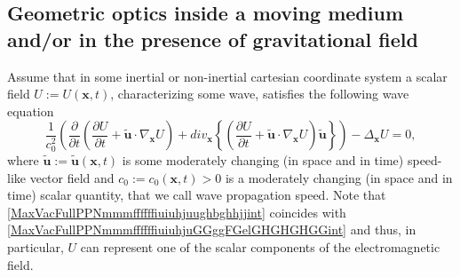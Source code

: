 \documentclass{article}
\theoremstyle{definition}
\theoremstyle{remark}
\renewcommand{\vec}[1]{\mathbf{#1}}
\newcommand{\er}{\eqref}
\newcommand{\er}{\eqref}
\begin{document}
\subsection{Geometric optics inside a moving medium and/or in the presence of gravitational
field}
Assume that in some inertial or non-inertial cartesian coordinate
system a scalar field $U:=U(\vec x,t)$, characterizing some wave,
satisfies the following wave equation
\begin{equation}\label{MaxVacFullPPNmmmffffffiuiuhjuughbghhjjint}
\frac{1}{c^2_0}\left(\frac{\partial}{\partial t}\left(\frac{\partial
U}{\partial t}+\vec {\tilde u}\cdot\nabla_{\vec x}U\right)+div_{\vec
x} \left\{\left(\frac{\partial U}{\partial t}+\vec {\tilde
u}\cdot\nabla_{\vec x} U\right)\vec {\tilde
u}\right\}\right)-\Delta_{\vec x}U=0,
\end{equation}
where $\vec {\tilde u}:=\vec {\tilde u}(\vec x,t)$ is some
moderately changing (in space and in time) speed-like vector field
and $c_0:=c_0(\vec x,t)>0$ is a moderately changing (in space and in
time) scalar quantity, that we call wave propagation speed. Note
that \er{MaxVacFullPPNmmmffffffiuiuhjuughbghhjjint} coincides with
\er{MaxVacFullPPNmmmffffffiuiuhjuGGggFGelGHGHGHGGint} and thus, in
particular, $U$ can represent one of the scalar components of the
electromagnetic field.
\end{document}
